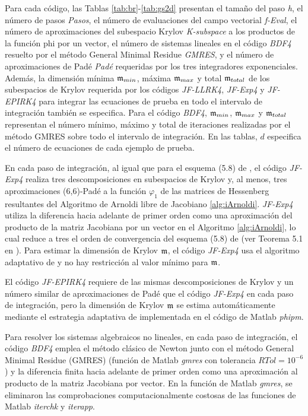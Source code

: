Para cada código, las Tablas \ref{tab:br}-\ref{tab:gs2d} presentan el tamaño del paso \textit{h}, el número de pasos \textit{Pasos}, el número de evaluaciones del campo vectorial \textit{f-Eval}, el número de aproximaciones del subespacio Krylov \textit{K-subspace} a los productos de la función phi por un vector, el número de sistemas lineales en el código \textit{BDF4} resuelto por el método General Minimal Residue \textit {GMRES}, y el número de aproximaciones de Padé \textit{Padé} requeridas por los tres integradores exponenciales. Además, la dimensión mínima $\mathfrak{m}_{min}$, máxima $\mathfrak{m}_{max}$ y total $\mathfrak{m}_{total}$ de los subespacios de Krylov requerida por los códigos \textit{JF-LLRK4}, \textit{JF-Exp4} y \textit{JF-EPIRK4} para integrar las ecuaciones de prueba en todo el intervalo de integración también se especifica. Para el código \emph{BDF4}, $\mathfrak{m}_{min}$, $\mathfrak{m}_{max}$ y $\mathfrak{m}_{total}$ representan el número mínimo, máximo y total de iteraciones realizadas por el método GMRES sobre todo el intervalo de integración. En las tablas, $d$ especifica el número de ecuaciones de cada ejemplo de prueba.

En cada paso de integración, al igual que para el esquema (5.8) de \cite{hochbruck1998exponential}, el código \textit{JF-Exp4} realiza tres descomposiciones en subespacios de Krylov y, al menos, tres aproximaciones (6,6)-Padé a la función $\varphi_1$ de las matrices de Hessenberg resultantes del Algoritmo de Arnoldi libre de Jacobiano \ref{alg:iArnoldi}. \textit{JF-Exp4} utiliza la diferencia hacia adelante de primer orden como una aproximación del producto de la matriz Jacobiana por un vector en el Algoritmo \ref{alg:iArnoldi}, lo cual reduce a tres el orden de convergencia del esquema (5.8) de \cite{hochbruck1998exponential} (ver Teorema 5.1 en \cite{hochbruck1998exponential}). Para estimar la dimensión de Krylov $\mathfrak{m}$, el código \textit{JF-Exp4} usa el algoritmo adaptativo de \cite{hochbruck1998exponential} y no hay restricción al valor mínimo para $\mathfrak{m}$.

El código \textit{JF-EPIRK4} requiere de las mismas descomposiciones de Krylov y un número similar de aproximaciones de Padé que el código \textit{JF-Exp4} en cada paso de integración, pero la dimensión de Krylov $\mathfrak{m}$ se estima automáticamente mediante el estrategia adaptativa de \cite{niesen2012algorithm} implementada en el código de Matlab \textit{phipm}.

Para resolver los sistemas algebraicos no lineales, en cada paso de integración, el código \textit{BDF4} emplea el método clásico de Newton junto con el método General Minimal Residue (GMRES) (función de Matlab \textit{gmres} con tolerancia $RTol=10^{-6}$) y la diferencia finita hacia adelante de primer orden como una aproximación al producto de la matriz Jacobiana por vector. En la función de Matlab \textit{gmres}, se eliminaron las comprobaciones computacionalmente costosas de las funciones de Matlab \textit{iterchk} y \textit{iterapp}.

